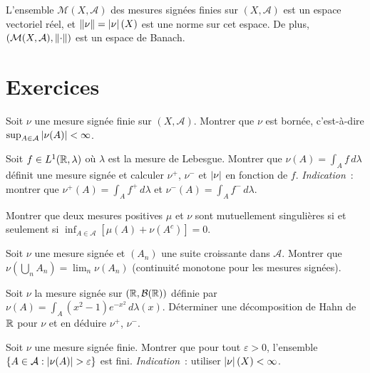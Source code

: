 \begin{proposition}
L'ensemble $\mathcal{M}(X, \mathcal{A})$ des mesures sign\'ees finies sur
$(X, \mathcal{A})$ est un espace vectoriel r\'eel, et
$\left\| \nu \right\| = \left| \nu \right|(X)$ est une norme sur cet espace. De plus,
$(\mathcal{M}(X, \mathcal{A}), \left\| \cdot \right\|)$ est un espace de Banach.
\end{proposition}

\section{Exercices}

\begin{exercice}
Soit $\nu$ une mesure sign\'ee finie sur $(X, \mathcal{A})$. Montrer que $\nu$
est born\'ee, c'est-\`a-dire $\sup_{A \in \mathcal{A}} \left| \nu(A) \right| < \infty$.
\end{exercice}

\begin{exercice}
Soit $f \in L^1(\mathbb{R}, \lambda)$ o\`u $\lambda$ est la mesure de Lebesgue. Montrer
que $\nu(A) = \int_A f\, d\lambda$ d\'efinit une mesure sign\'ee et calculer
$\nu^+$, $\nu^-$ et $\left| \nu \right|$ en fonction de $f$.
\emph{Indication}~: montrer que $\nu^+(A) = \int_A f^+\, d\lambda$ et
$\nu^-(A) = \int_A f^-\, d\lambda$.
\end{exercice}

\begin{exercice}
Montrer que deux mesures positives $\mu$ et $\nu$ sont mutuellement singuli\`eres
si et seulement si $\inf_{A \in \mathcal{A}} [\mu(A) + \nu(A^c)] = 0$.
\end{exercice}

\begin{exercice}
Soit $\nu$ une mesure sign\'ee et $(A_n)$ une suite croissante dans $\mathcal{A}$.
Montrer que $\nu(\bigcup_n A_n) = \lim_n \nu(A_n)$ (continuit\'e monotone
pour les mesures sign\'ees).
\end{exercice}

\begin{exercice}
Soit $\nu$ la mesure sign\'ee sur $(\mathbb{R}, \mathcal{B}(\mathbb{R}))$ d\'efinie par
$\nu(A) = \int_A (x^2 - 1) e^{-x^2}\, d\lambda(x)$. D\'eterminer une
d\'ecomposition de Hahn de $\mathbb{R}$ pour $\nu$ et en d\'eduire $\nu^+$, $\nu^-$.
\end{exercice}

\begin{exercice}
Soit $\nu$ une mesure sign\'ee finie. Montrer que pour tout $\varepsilon > 0$,
l'ensemble $\{A \in \mathcal{A} : \left| \nu(A) \right| > \varepsilon\}$ est fini.
\emph{Indication}~: utiliser $\left| \nu \right|(X) < \infty$.
\end{exercice}
